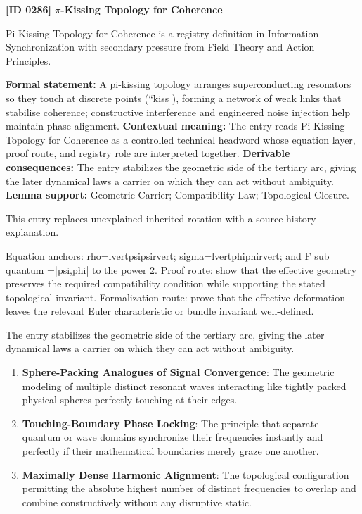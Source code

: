 \clearpage
\noindent\textbf{[ID 0286] $\pi$-Kissing Topology for Coherence}\par
\vspace{0.35em}
\begingroup\small
{}
Pi-Kissing Topology for Coherence is a registry definition in Information Synchronization with secondary pressure from Field Theory and Action Principles.

\begingroup\footnotesize\setlength{\emergencystretch}{3em}\sloppy
\textbf{Formal statement:} A pi-kissing topology arranges superconducting resonators so they touch at discrete points (``kiss ), forming a network of weak links that stabilise coherence; constructive interference and engineered noise injection help maintain phase alignment. \textbf{Contextual meaning:} The entry reads Pi-Kissing Topology for Coherence as a controlled technical headword whose equation layer, proof route, and registry role are interpreted together. \textbf{Derivable consequences:} The entry stabilizes the geometric side of the tertiary arc, giving the later dynamical laws a carrier on which they can act without ambiguity. \textbf{Lemma support:} Geometric Carrier; Compatibility Law; Topological Closure.\par
\endgroup

This entry replaces unexplained inherited rotation with a source-history explanation.

Equation anchors: rho=lvertpsipsirvert; sigma=lvertphiphirvert; and F sub quantum =|psi,phi| to the power 2. Proof route: show that the effective geometry preserves the required compatibility condition while supporting the stated topological invariant. Formalization route: prove that the effective deformation leaves the relevant Euler characteristic or bundle invariant well-defined.

The entry stabilizes the geometric side of the tertiary arc, giving the later dynamical laws a carrier on which they can act without ambiguity.
\endgroup

\begin{enumerate}[leftmargin=1.6em,itemsep=6pt,topsep=4pt]
\item \textbf{Sphere-Packing Analogues of Signal Convergence}: The geometric modeling of multiple distinct resonant waves interacting like tightly packed physical spheres perfectly touching at their edges.
\item \textbf{Touching-Boundary Phase Locking}: The principle that separate quantum or wave domains synchronize their frequencies instantly and perfectly if their mathematical boundaries merely graze one another.
\item \textbf{Maximally Dense Harmonic Alignment}: The topological configuration permitting the absolute highest number of distinct frequencies to overlap and combine constructively without any disruptive static.
\end{enumerate}

